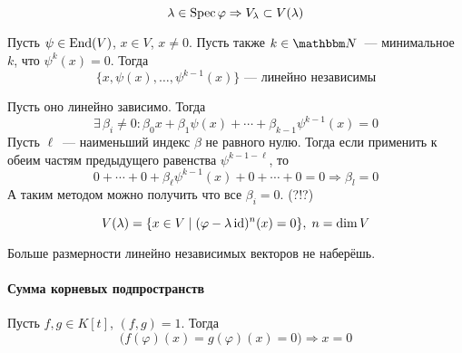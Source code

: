 \documentclass[12pt]{../../../notes}
\begin{document}
\begin{stat}\label{stat:linop::rootsp::eigenrel}
  \[
    \lambda \in \operatorname{Spec} \varphi \Rightarrow V_\lambda \subset V(\lambda) 
  \]
\end{stat}

\begin{lem}\label{lem:linop::rootsp::lindep}
  Пусть $\psi \in \operatorname{End}(V)$, $x\in V$, $x \neq 0$. Пусть также $k \in \N$~--- минимальное
  $k$, что $\psi^k (x) =  0$. Тогда
  \[
    \{x, \psi(x) , \dotsc , \psi^{k-1}(x) \} \text{~--- линейно независимы}
  \]
\end{lem}
\begin{itlproof}
  Пусть оно линейно зависимо. Тогда
  \[
    \exists\, \beta_i \neq 0 \colon \beta_0 x + \beta_1 \psi(x) + \dotsb + \beta_{k-1}
    \psi^{k-1} (x) = 0
  \]
  Пусть $\ell$~--- наименьший индекс $\beta$ не равного нулю. Тогда если применить к обеим
  частям предыдущего равенства $\psi^{k-1-\ell}$, то
  \[
    0 + \dotsb + 0 +\beta_\ell \psi ^{k-1} (x) + 0+ \dotsb + 0 = 0 \Rightarrow \beta_l = 0 
  \]
  А таким методом можно получить что все $\beta_i = 0$. (?!?)
\end{itlproof}

\begin{stat}\label{stat:linop::rootsp::heightlessdim}
  \[
    V(\lambda) = \{ x\in V \mid (\varphi - \lambda \operatorname{id})^n(x) = 0 \}, \; n = \dim V
  \]
\end{stat}
\begin{itlproof}
  Больше размерности линейно независимых векторов не наберёшь.
\end{itlproof}

\paragraph{Сумма корневых подпространств}

\begin{lem}\label{lem:linop::rootspsum::gcd}
  Пусть $f, g\in K[t]$, $(f, g) = 1$. Тогда 
  \[
    \big( f(\varphi)(x) = g(\varphi)(x) = 0 \big) \Rightarrow x = 0
  \]
\end{lem}
\end{document}
